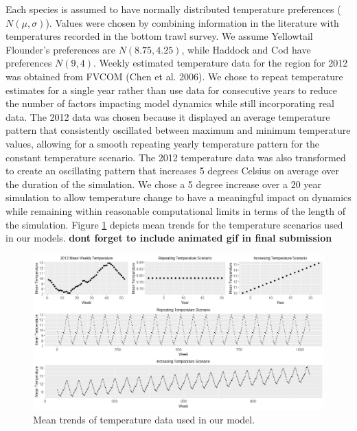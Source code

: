 \documentclass[
  12pt,
]{article}
\begin{document}
Each species is assumed to have normally distributed temperature preferences (\(N(\mu,\sigma)\)). Values were chosen by combining information in the literature with temperatures recorded in the bottom trawl survey. We assume Yellowtail Flounder's preferences are \(N(8.75,4.25)\), while Haddock and Cod have preferences \(N(9,4)\). Weekly estimated temperature data for the region for 2012 was obtained from FVCOM (Chen et al. 2006). We chose to repeat temperature estimates for a single year rather than use data for consecutive years to reduce the number of factors impacting model dynamics while still incorporating real data. The 2012 data was chosen because it displayed an average temperature pattern that consistently oscillated between maximum and minimum temperature values, allowing for a smooth repeating yearly temperature pattern for the constant temperature scenario. The 2012 temperature data was also transformed to create an oscillating pattern that increases 5 degrees Celsius on average over the duration of the simulation. We chose a 5 degree increase over a 20 year simulation to allow temperature change to have a meaningful impact on dynamics while remaining within reasonable computational limits in terms of the length of the simulation. Figure \ref{fig:temp-scenarios} depicts mean trends for the temperature scenarios used in our models. \textbf{dont forget to include animated gif in final submission}

\begin{figure}

{\centering \includegraphics[width=0.95\linewidth]{Images/TempScenarios} 

}

\caption{Mean trends of temperature data used in our model.}\label{fig:temp-scenarios}
\end{figure}
\end{document}
